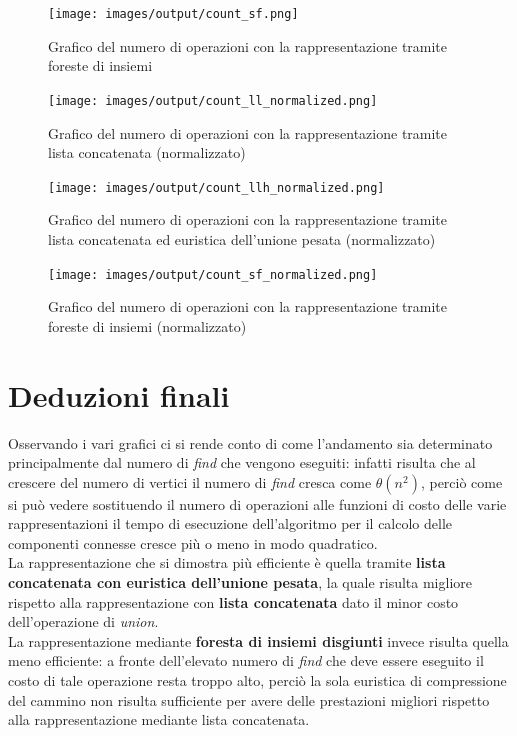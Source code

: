 \documentclass[12pt]{article}
\begin{document}
    \begin{figure}[h]
        \texttt{[image: images/output/count\_sf.png]}
        \caption{Grafico del numero di operazioni con la rappresentazione tramite foreste di insiemi}
        \label{fig:count_sf}
    \end{figure}

    \begin{figure}[h]
        \texttt{[image: images/output/count\_ll\_normalized.png]}
        \caption{Grafico del numero di operazioni con la rappresentazione tramite lista concatenata (normalizzato)}
        \label{fig:count_ll_normalized}
    \end{figure}

    \begin{figure}[h]
        \texttt{[image: images/output/count\_llh\_normalized.png]}
        \caption{Grafico del numero di operazioni con la rappresentazione tramite lista concatenata ed euristica dell'unione pesata (normalizzato)}
        \label{fig:count_llh_normalized}
    \end{figure}

    \begin{figure}[h]
        \texttt{[image: images/output/count\_sf\_normalized.png]}
        \caption{Grafico del numero di operazioni con la rappresentazione tramite foreste di insiemi (normalizzato)}
        \label{fig:count_sf_normalized}
    \end{figure}


\section{Deduzioni finali}
Osservando i vari grafici ci si rende conto di come l'andamento sia determinato principalmente dal numero di \textit{find} che vengono eseguiti: infatti risulta che al crescere del numero di vertici il numero di \textit{find} cresca come $\theta(n^2)$, perciò come si può vedere sostituendo il numero di operazioni alle funzioni di costo delle varie rappresentazioni il tempo di esecuzione dell'algoritmo per il calcolo delle componenti connesse cresce più o meno in modo quadratico.\\
La rappresentazione che si dimostra più efficiente è quella tramite \textbf{lista concatenata con euristica dell'unione pesata}, la quale risulta migliore rispetto alla rappresentazione con \textbf{lista concatenata} dato il minor costo dell'operazione di \textit{union}.\\
La rappresentazione mediante \textbf{foresta di insiemi disgiunti} invece risulta quella meno efficiente: a fronte dell'elevato numero di \textit{find} che deve essere eseguito il costo di tale operazione resta troppo alto, perciò la sola euristica di compressione del cammino non risulta sufficiente per avere delle prestazioni migliori rispetto alla rappresentazione mediante lista concatenata.

\printbibliography
\end{document}
